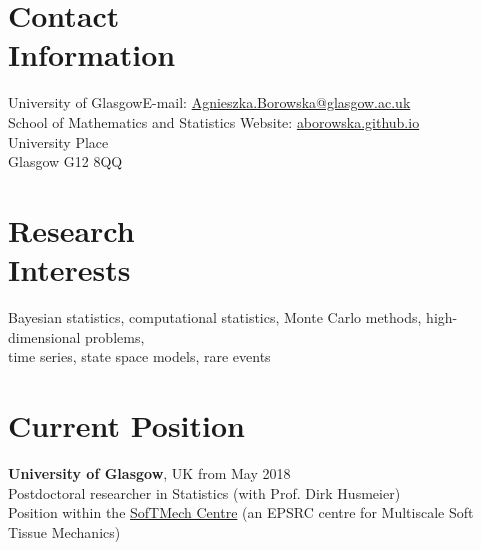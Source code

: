 \documentclass[margin,line]{resume}
\begin{document}
\begin{resume}
    \section{\mysidestyle Contact\\Information}
    University of Glasgow\hfill  E-mail: \url{Agnieszka.Borowska@glasgow.ac.uk} \\
    School of Mathematics and Statistics \hfill Website: \url{aborowska.github.io}\\ \vspace{0mm}%
    University Place \\
    Glasgow G12 8QQ\\ \vspace{-4.6mm}%
    \section{\mysidestyle Research\\Interests}
    
    Bayesian statistics, computational statistics, Monte Carlo methods, high-dimensional problems,\\
    time series, state space models, rare events
\vspace{-1mm}   
 
    \section{\mysidestyle Current Position}
    \textbf{University of Glasgow},  UK \hfill from May 2018\\
	Postdoctoral researcher in Statistics (with Prof. Dirk Husmeier)\\ 
    Position within the \href{http://softmech.org/}{SofTMech Centre} (an EPSRC centre for Multiscale Soft Tissue Mechanics)

\vspace{-1mm}    

\end{resume}
\end{document}
